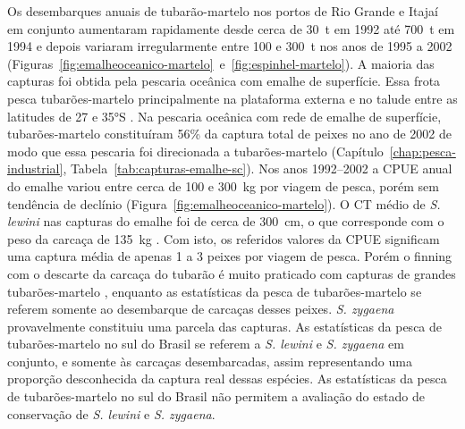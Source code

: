 \documentclass[a4paper,11pt,twoside,showtrims,onecolumn,openright,final]{memoir}
\begin{document}
Os desembarques anuais de tubarão-martelo nos portos de Rio Grande e Itajaí em conjunto 
aumentaram rapidamente desde cerca de 30~t em 1992 até 700~t em 1994 e depois variaram 
irregularmente entre 100 e 300~t nos anos de 1995 a 2002 (Figuras~\ref{fig:emalheoceanico-martelo}~e~\ref{fig:espinhel-martelo}). %
A maioria das capturas foi obtida pela pescaria oceânica com emalhe de superfície. 
Essa frota pesca tubarões-martelo principalmente 
na plataforma externa e no talude entre as latitudes de 27 e 35°S \citep{kotas2004}. %
Na pescaria oceânica com rede de emalhe de superfície, tubarões-martelo constituíram 56\% 
da captura total de peixes no ano de 2002 de modo que essa pescaria 
foi direcionada a tubarões-martelo (Capítulo~\ref{chap:pesca-industrial}, Tabela~\ref{tab:capturas-emalhe-sc}). %
Nos anos 1992--2002 a CPUE anual do emalhe variou entre cerca de 100 e 300~kg por viagem de pesca,  
porém sem tendência de declínio (Figura~\ref{fig:emalheoceanico-martelo}). %
O CT médio de \emph{S. lewini} nas capturas do emalhe foi de cerca de 300~cm, o que corresponde 
com o peso da carcaça de 135~kg \citep{kotas2004}. %
Com isto, os referidos valores da CPUE significam uma captura média de apenas 1 a 3 peixes 
por viagem de pesca. Porém o finning com o descarte da carcaça do tubarão é muito praticado com 
capturas de grandes tubarões-martelo \citep{kotas2004}, 
enquanto as estatísticas da pesca de tubarões-martelo se referem somente ao desembarque de 
carcaças desses peixes. \emph{S. zygaena} provavelmente constituiu uma parcela das capturas. 
As estatísticas da pesca de tubarões-martelo  no sul do Brasil se referem a \emph{S. lewini} 
e \emph{S. zygaena} em conjunto, e somente às carcaças desembarcadas, assim representando uma 
proporção desconhecida da captura real dessas espécies. As estatísticas da pesca de tubarões-martelo 
no sul do Brasil não permitem a avaliação do estado de conservação de \emph{S. lewini} e \emph{S. zygaena}. 
\end{document}
